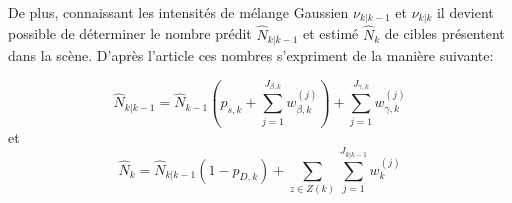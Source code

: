 \documentclass[10pt,french,a4paper]{report}
\begin{document}
	De plus, connaissant les intensités de mélange Gaussien $\nu_{k|k-1}$ et $\nu_{k|k}$ il devient possible de déterminer le nombre prédit $\hat{N}_{k|k-1}$  et estimé $\hat{N}_{k}$  de cibles présentent dans la scène. D'après l'article \cite{Vo06a} ces nombres s'expriment de la manière suivante:
	
\begin{equation}
	\hat{N}_{k|k-1}=\hat{N}_{k-1}  \left(  p_{s,k}+\sum\limits_{j=1}^{J_{\beta,k}}w_{\beta,k}^{(j)} \right) +\sum\limits_{j=1}^{J_{\gamma,k}}w_{\gamma,k}^{(j)}
\end{equation}
et
\begin{equation}
	\hat{N}_{k}=\hat{N}_{k|k-1}(1-p_{D,k}) + \sum\limits_{z\in Z(k)} \sum\limits_{j=1}^{J_{k|k-1}}w_{k}^{(j)}
\end{equation}
%
%
%
%
%
%
%
%
%
\end{document}
